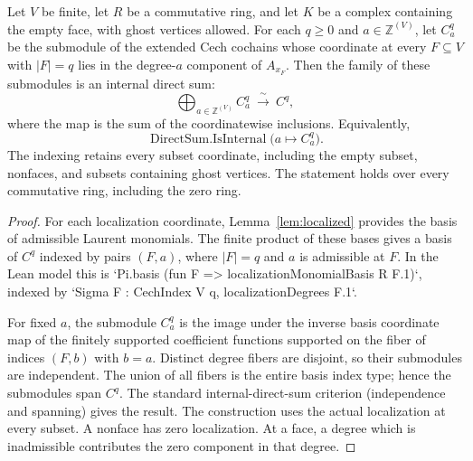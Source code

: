 \begin{lemma}\label{lem:cech-termwise-decomposition}
Let $V$ be finite, let $R$ be a commutative ring, and let $K$ be a complex
containing the empty face, with ghost vertices allowed. For each $q\geq0$
and $a\in\mathbb Z^{(V)}$, let $C^q_a$ be the submodule of the extended
Cech cochains whose coordinate at every $F\subseteq V$ with $|F|=q$ lies
in the degree-$a$ component of $A_{x_F}$. Then the family of these
submodules is an internal direct sum:
\[
  \bigoplus_{a\in\mathbb Z^{(V)}} C^q_a\ \xrightarrow{\ \sim\ }\ C^q,
\]
where the map is the sum of the coordinatewise inclusions. Equivalently,
\[
  \operatorname{DirectSum.IsInternal}\bigl(a\mapsto C^q_a\bigr).
\]
The indexing retains every subset coordinate, including the empty subset,
nonfaces, and subsets containing ghost vertices. The statement holds over
every commutative ring, including the zero ring.
\leanok
\end{lemma}
\begin{proof}
For each localization coordinate, Lemma~\ref{lem:localized} provides the
basis of admissible Laurent monomials. The finite product of these bases
gives a basis of $C^q$ indexed by pairs $(F,a)$, where $|F|=q$ and $a$ is
admissible at $F$. In the Lean model this is
`Pi.basis (fun F => localizationMonomialBasis R F.1)`, indexed by
`Sigma F : CechIndex V q, localizationDegrees F.1`.

For fixed $a$, the submodule $C^q_a$ is the image under the inverse basis
coordinate map of the finitely supported coefficient functions supported
on the fiber of indices $(F,b)$ with $b=a$. Distinct degree fibers are
disjoint, so their submodules are independent. The union of all fibers is
the entire basis index type; hence the submodules span $C^q$. The standard
internal-direct-sum criterion (independence and spanning) gives the result.
The construction uses the actual localization at every subset. A nonface
has zero localization. At a face, a degree which is inadmissible
contributes the zero component in that degree.
\end{proof}

